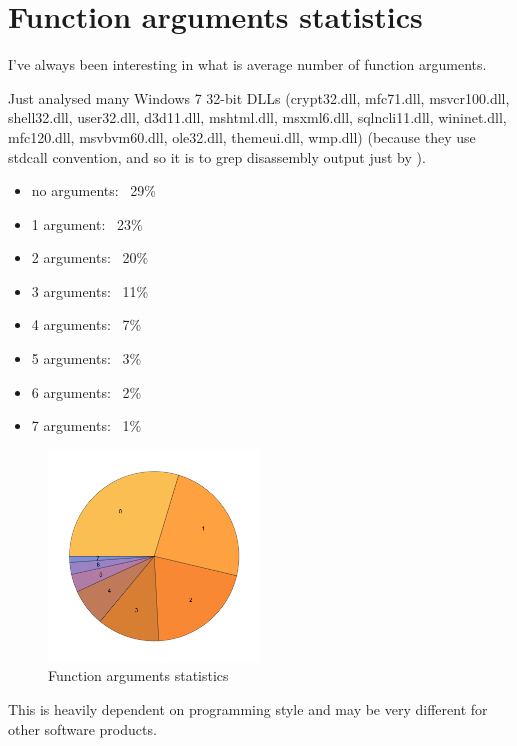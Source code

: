 \section{Function arguments statistics}
\label{args_stat}

I've always been interesting in what is average number of function arguments.

Just analysed many Windows 7 32-bit DLLs (crypt32.dll, mfc71.dll, msvcr100.dll, shell32.dll, 
user32.dll, d3d11.dll, mshtml.dll, msxml6.dll, sqlncli11.dll, wininet.dll, mfc120.dll, msvbvm60.dll, ole32.dll, themeui.dll, wmp.dll) 
(because they use stdcall convention, and so it is to grep disassembly output just by ).

\begin{itemize}
\item no arguments: ~29\%
\item 1 argument: ~23\%
\item 2 arguments: ~20\%
\item 3 arguments: ~11\%
\item 4 arguments: ~7\%
\item 5 arguments: ~3\%
\item 6 arguments: ~2\%
\item 7 arguments: ~1\%
\end{itemize}

\begin{figure}[H]
\centering
\includegraphics[width=0.5\textwidth]{other/args_stat.png}
\caption{Function arguments statistics}
\end{figure}

This is heavily dependent on programming style and may be very different for other software products.

